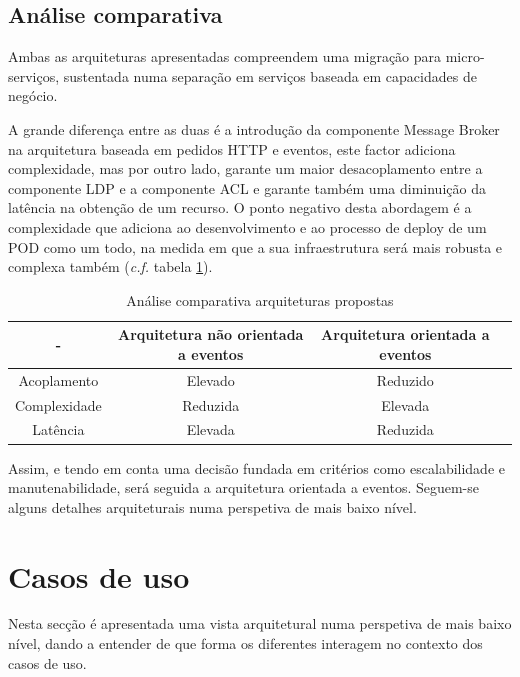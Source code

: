\subsection{Análise comparativa \label{conclusão_arquitetura}}
Ambas as arquiteturas apresentadas compreendem uma migração para micro-serviços, sustentada numa separação em serviços baseada em capacidades de negócio.

A grande diferença entre as duas é a introdução da componente Message Broker na arquitetura baseada em pedidos HTTP e eventos, este factor adiciona complexidade, mas por outro lado, garante um maior desacoplamento entre a componente LDP e a componente ACL e garante também uma diminuição da latência na obtenção de um recurso. O ponto negativo desta abordagem é a complexidade que adiciona ao desenvolvimento e ao processo de deploy de um POD como um todo, na medida em que a sua infraestrutura será mais robusta e complexa também (\emph{c.f.} tabela \ref{table_comparacao_arquiteturas}).

\begin{table}[h]
\centering
\caption{Análise comparativa arquiteturas propostas}
\vspace{0.5cm}
\label{table_comparacao_arquiteturas}
\begin{tabular}{c|c|c|c} 
- & Arquitetura não orientada a eventos  & Arquitetura orientada a eventos \\
\hline                          
Acoplamento & Elevado & Reduzido \\
Complexidade & Reduzida & Elevada \\
Latência & Elevada & Reduzida \\
\end{tabular}
\end{table}

Assim, e tendo em conta uma decisão fundada em critérios como escalabilidade e manutenabilidade, será seguida a arquitetura orientada a eventos. Seguem-se alguns detalhes arquiteturais numa perspetiva de mais baixo nível.

\section{Casos de uso}
Nesta secção é apresentada uma vista arquitetural numa perspetiva de mais baixo nível, dando a entender de que forma os diferentes interagem no contexto dos casos de uso.

